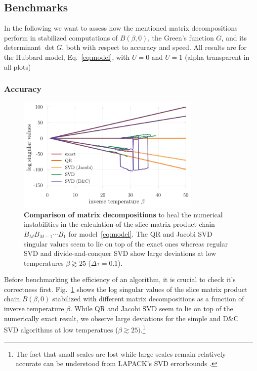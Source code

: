 \documentclass[submission, Phys]{SciPost}
\begin{document}
\subsection{Benchmarks}\label{sec:benchmarks}

In the following we want to assess how the mentioned matrix decompositions perform in stabilized computations of $B(\beta, 0)$, the Green's function $G$, and its determinant $\det G$, both with respect to accuracy and speed. All results are for the Hubbard model, Eq.~\ref{eq:model}, with $U=0$ and $U=1$ (alpha transparent in all plots)

\subsubsection{Accuracy}

\begin{figure}
	\centering
	\includegraphics[width=0.8\textwidth]{figures/decomp_comparison_simple.pdf}
	\caption{\textbf{Comparison of matrix decompositions} to heal the numerical instabilities in the calculation of the slice matrix product chain $B_M B_{M-1} \cdots B_1$ for model~\eqref{eq:model}. The QR and Jacobi SVD singular values seem to lie on top of the exact ones whereas regular SVD and divide-and-conquer SVD show large deviations at low temperatures $\beta \gtrsim 25$ ($\Delta \tau = 0.1$).}
	\label{fig:decomp_comparison_simple}
\end{figure}

Before benchmarking the efficiency of an algorithm, it is crucial to check it's correctness first. Fig.~\ref{fig:decomp_comparison_simple} shows the log singular values of the slice matrix product chain $B(\beta, 0)$ stabilized with different matrix decompositions as a function of inverse temperature $\beta$. While QR and Jacobi SVD seem to lie on top of the numerically exact result, we observe large deviations for the simple and D\&C SVD algorithms at low temperatues ($\beta \gtrsim 25)$.\footnote{The fact that small scales are lost while large scales remain relatively accurate can be understood from LAPACK's SVD errorbounds \cite{errorbounds}.}\\
\end{document}
